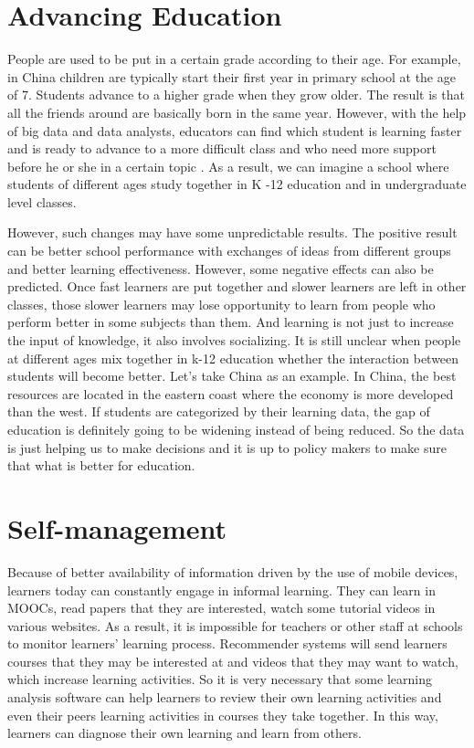 \documentclass[sigconf]{acmart}
\begin{document}
\section{Advancing Education}
People are used to be put in a certain grade according to their age. For example, in China children are typically start their first year in primary school at the age of  7. Students advance to a higher grade when they grow older. The result is that all the friends around are basically born in the same year. However, with the help of big data and data analysts, educators can find which student is learning faster and is ready to advance to a more difficult class and who need more support before he or she in a certain topic \cite{Kerns2013}.
As a result, we can imagine a school where students of different ages study together in K -12 education and in undergraduate level classes. 

However, such changes may have some unpredictable results. The positive result can be better school performance with exchanges of ideas from different groups and better learning effectiveness. However, some negative effects can also be predicted. Once fast learners are put together and slower learners are left in other classes, those slower learners may lose opportunity to learn from people who perform better in some subjects than them. And learning is not just to increase the input of knowledge, it also involves socializing. It is still unclear when people at different ages mix together in k-12 education whether the interaction between students will become better. Let’s take China as an example. In China, the best resources are located in the eastern coast where the economy is more developed than the west. If students are categorized by their learning data, the gap of education is definitely going to be widening instead of being reduced. So the data is just helping us to make decisions and it is up to policy makers to make sure that what is better for education.

\section{Self-management}
Because of better availability of information driven by the use of mobile devices, learners today can constantly engage in informal learning. They can learn in MOOCs, read papers that they are interested, watch some tutorial videos in various websites. As a result, it is impossible for teachers or other staff at schools to monitor learners' learning process. Recommender systems will send learners courses that they may be interested at and videos that they may want to watch, which increase learning activities. So it is very necessary that some learning analysis software can help learners to review their own learning activities and even their peers learning activities in courses they take together. In this way, learners can diagnose their own learning and learn from others.
\end{document}

